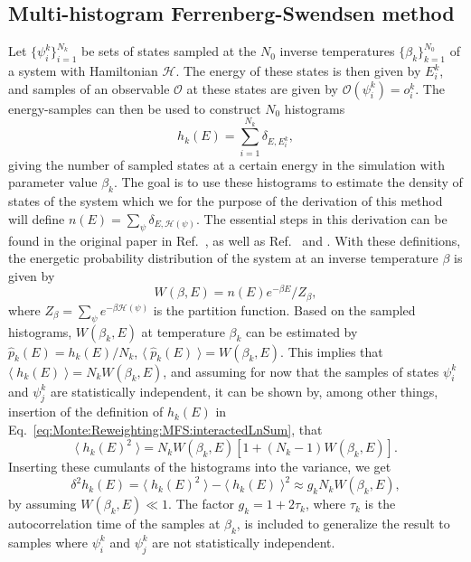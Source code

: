 \subsection{Multi-histogram Ferrenberg-Swendsen method}

Let $\{\psi_i^k\}_{i=1}^{N_k}$ be sets of states sampled at the $N_0$ inverse temperatures $\{\beta_k\}_{k=1}^{N_0}$ of a system with Hamiltonian $\mathcal{H}$.
The energy of these states is then given by $E_i^k$, and samples of an observable $\mathcal{O}$ at these states are given by $\mathcal{O}(\psi_i^k) = o_i^k$.
The energy-samples can then be used to construct $N_0$ histograms
\begin{equation}
    \label{eq:Monte:Reweighting:MFS:interactedLnSum}
    h_k(E) = \sum_{i=1}^{N_k}\delta_{E,E_i^k},
\end{equation}
giving the number of sampled states at a certain energy in the simulation with parameter value $\beta_k$. The goal is to use these histograms to estimate the
density of states of the system which we for the purpose of the derivation of this method will define $n(E) = \sum_\psi\delta_{E,\mathcal{H}(\psi)}$.
The essential steps in this derivation can be found in the original paper in Ref.~\cite{FS_1989}, as well as Ref.~\cite{Newman99} and \cite{rummukainen}.
With these
definitions, the energetic probability distribution of the system at an inverse temperature $\beta$ is given by
\begin{equation}
    \label{eq:Monte:Reweighting:MFS:enProbDist}
    W(\beta,E) = n(E)e^{-\beta E}/Z_\beta,
\end{equation}
where $Z_\beta = \sum_\psi e^{-\beta\mathcal{H}(\psi)}$ is the partition function. Based on the sampled histograms, $W(\beta_k,E)$ at temperature $\beta_k$ can be estimated
by $\hat{p}_k(E) = h_k(E)/N_k$, \ie $\langle\;\hat{p}_k(E)\;\rangle = W(\beta_k,E)$. This implies that $\langle\;h_k(E)\;\rangle = N_kW(\beta_k,E)$, and assuming for now
that the samples of states $\psi_i^k$ and $\psi_j^k$ are statistically independent, it can be shown by, among other things, insertion of the definition of $h_k(E)$ in Eq.~\eqref{eq:Monte:Reweighting:MFS:interactedLnSum}, that 
\begin{equation}
    \label{eq:Monte:Reweighting:MFS:avgHistogramSquared}
    \langle\;h_k(E)^2\;\rangle = N_kW(\beta_k,E)[1 + (N_k-1)W(\beta_k,E)].
\end{equation}
Inserting these cumulants of the histograms into the variance, we get
\begin{equation}
    \label{eq:Monte:Reweighting:MFS:histogramVariance}
    \delta^2h_k(E) = \langle\;h_k(E)^2\;\rangle - \langle\;h_k(E)\;\rangle^2 \approx g_kN_kW(\beta_k,E),
\end{equation}
by assuming $W(\beta_k,E)\ll1$. The factor $g_k = 1+2\tau_k$, where $\tau_k$ is the autocorrelation time of the samples at $\beta_k$, is included to generalize the result
to samples where $\psi_i^k$ and $\psi_j^k$ are not statistically independent.

